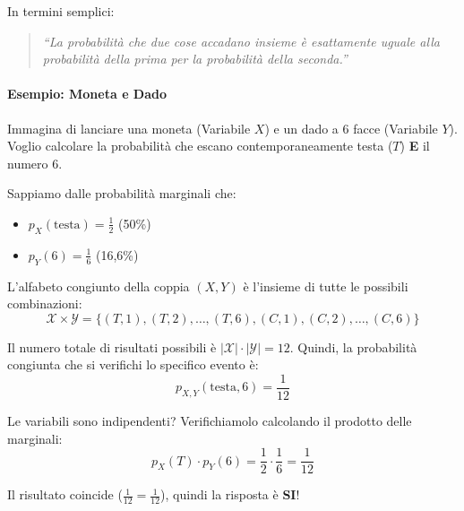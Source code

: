 In termini semplici:
\begin{quote}
    \textit{``La probabilità che due cose accadano insieme è esattamente uguale alla probabilità della prima per la probabilità della seconda.''}
\end{quote}

\paragraph{Esempio: Moneta e Dado}
Immagina di lanciare una moneta (Variabile $X$) e un dado a 6 facce (Variabile $Y$).
\\Voglio calcolare la probabilità che escano contemporaneamente testa ($T$) \textbf{E} il numero 6.

Sappiamo dalle probabilità marginali che:
\begin{itemize}
    \item $p_X(\text{testa}) = \frac{1}{2}$ (50\%)
    \item $p_Y(6) = \frac{1}{6}$ (16,6\%)
\end{itemize}

L'alfabeto congiunto della coppia $(X, Y)$ è l'insieme di tutte le possibili combinazioni:
\[ \mathcal{X} \times \mathcal{Y} = \{(T,1), (T,2), \dots, (T,6), (C,1), (C,2), \dots, (C,6)\} \]

Il numero totale di risultati possibili è $|\mathcal{X}| \cdot |\mathcal{Y}| = 12$. 
Quindi, la probabilità congiunta che si verifichi lo specifico evento è:
\[ p_{X,Y}(\text{testa}, 6) = \frac{1}{12} \]

Le variabili sono indipendenti? Verifichiamolo calcolando il prodotto delle marginali:
\[ p_X(T) \cdot p_Y(6) = \frac{1}{2} \cdot \frac{1}{6} = \frac{1}{12} \]

Il risultato coincide ($\frac{1}{12} = \frac{1}{12}$), quindi la risposta è \textbf{SI}!

